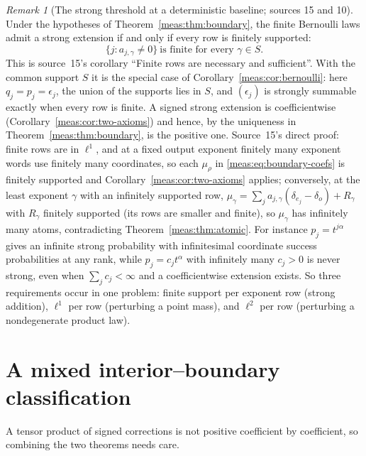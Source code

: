 \documentclass[11pt]{article}
\numberwithin{equation}{section}
\theoremstyle{definition}
\theoremstyle{remark}
\newtheorem{remark}[theorem]{Remark}
\begin{document}
\begin{remark}[The strong threshold at a deterministic baseline; sources 15
and 10]\label{meas:rem:rowfinite}
Under the hypotheses of Theorem~\ref{meas:thm:boundary}, the finite Bernoulli laws
admit a strong extension if and only if every row is finitely supported:
\begin{equation}\label{meas:eq:rowfinite}
 \{j:a_{j,\gamma}\ne0\}\ \text{is finite for every }\gamma\in S.
\end{equation}
This is source~15's corollary ``Finite rows are necessary and sufficient''. With
the common support $S$ it is the special case of
Corollary~\ref{meas:cor:bernoulli}: here $q_j=p_j=\epsilon_j$, the union of the
supports lies in $S$, and $(\epsilon_j)$ is strongly summable exactly when every row
is finite. A signed strong extension is coefficientwise
(Corollary~\ref{meas:cor:two-axioms}) and hence, by the uniqueness in
Theorem~\ref{meas:thm:boundary}, is the positive one. Source~15's direct proof:
finite rows are in $\ell^1$, and at a fixed output exponent finitely many exponent
words use finitely many coordinates, so each $\mu_\rho$ in
\eqref{meas:eq:boundary-coefs} is finitely supported and
Corollary~\ref{meas:cor:two-axioms} applies; conversely, at the least exponent
$\gamma$ with an infinitely supported row, $\mu_\gamma=\sum_ja_{j,\gamma}(\delta_{e_j}-\delta_o)+R_\gamma$
with $R_\gamma$ finitely supported (its rows are smaller and finite), so $\mu_\gamma$ has
infinitely many atoms, contradicting Theorem~\ref{meas:thm:atomic}. For instance
$p_j=t^{j\alpha}$ gives an infinite strong probability with infinitesimal
coordinate success probabilities at any rank, while $p_j=c_jt^\alpha$ with
infinitely many $c_j>0$ is never strong, even when $\sum_jc_j<\infty$ and a
coefficientwise extension exists. So three requirements occur in one problem:
finite support per exponent row (strong addition), $\ell^1$ per row (perturbing a
point mass), and $\ell^2$ per row (perturbing a nondegenerate product law).
\end{remark}

\section{A mixed interior--boundary classification}\label{meas:sec:mixed}

A tensor product of signed corrections is not positive coefficient by
coefficient, so combining the two theorems needs care.
\end{document}
